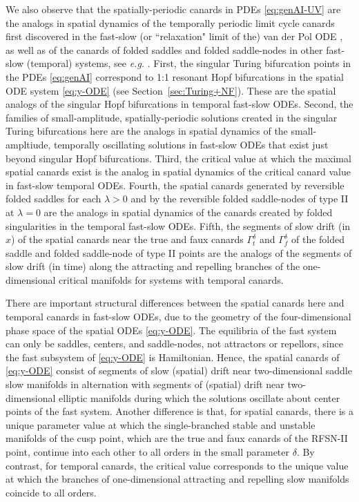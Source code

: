 \documentclass[11pt]{article}
\numberwithin{equation}{section}
\begin{document}
We also observe that the spatially-periodic canards in PDEs \eqref{eq:genAI-UV} are the analogs in spatial dynamics of the temporally periodic limit cycle canards first discovered in the fast-slow (or ``relaxation" limit of the) van der Pol ODE \cite{BCDD1981,D1984,DR1996,E1983}, as well as of the canards of folded saddles and folded saddle-nodes in other fast-slow (temporal) systems, see {\it e.g.} \cite{KS2001,KW2010,MKKR1984,MW2017,Moehlis,RKZE2003}. 
First, the singular Turing bifurcation points in the PDEs \eqref{eq:genAI} correspond to 1:1 resonant Hopf bifurcations in the spatial ODE system \eqref{eq:y-ODE} (see Section~\ref{sec:Turing+NF}).
These are the spatial analogs of the singular Hopf bifurcations in temporal fast-slow ODEs.
Second, the families of small-amplitude, spatially-periodic solutions created in the singular Turing bifurcations here are the analogs in spatial dynamics of the small-ampltiude, temporally oscillating solutions in fast-slow ODEs that exist just beyond singular Hopf bifurcations. 
Third, the critical value at which the maximal spatial canards exist is the analog in spatial dynamics of the critical canard value in fast-slow temporal ODEs. 
Fourth, the spatial canards generated by reversible folded saddles for each $\lambda>0$ and by the reversible folded saddle-nodes of type II at $\lambda=0$ are the analogs in spatial dynamics of the canards created by folded singularities in the temporal fast-slow ODEs.
Fifth, the segments of slow drift (in $x$) of the spatial canards near the true and faux canards $\Gamma_t^\delta$ and $\Gamma_f^\delta$ of the folded saddle and folded saddle-node of type II points are the analogs of the segments of slow drift (in time) along the attracting and repelling branches of the one-dimensional critical manifolds for systems with temporal canards.

There are important structural differences between the spatial canards here and temporal canards in fast-slow ODEs, due to the geometry of the four-dimensional phase space of the spatial ODEs \eqref{eq:y-ODE}.
The equilibria of the fast system can only be saddles, centers, and saddle-nodes, not attractors or repellors, since the fast subsystem of \eqref{eq:y-ODE} is Hamiltonian.
Hence, the spatial canards of \eqref{eq:y-ODE} consist of segments of slow (spatial) drift near two-dimensional saddle slow manifolds in alternation with segments of (spatial) drift near two-dimensional elliptic manifolds during which the solutions oscillate about center points of the fast system.
Another difference is that, for spatial canards, there is a unique parameter value at which the single-branched stable and unstable manifolds of the cusp point, which are the true and faux canards of the RFSN-II point, continue into each other to all orders in the small parameter $\delta$.
By contrast, for temporal canards, the critical value corresponds to the unique value at which the branches of one-dimensional attracting and repelling slow manifolds coincide to all orders.
\end{document}

